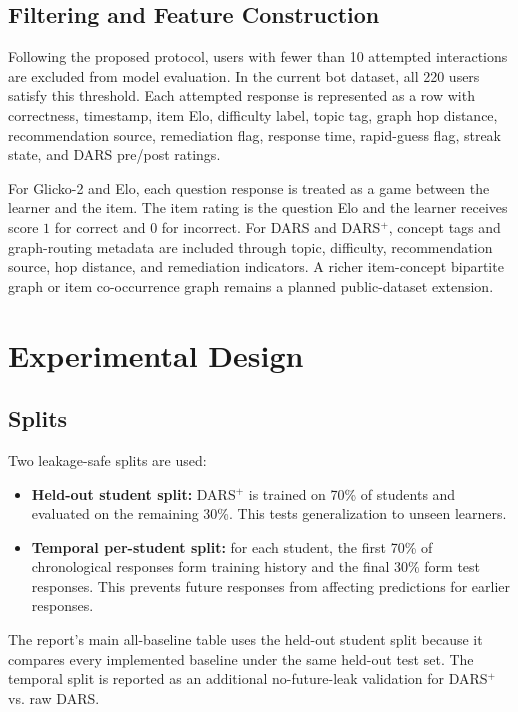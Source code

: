 \documentclass[sigconf,nonacm]{acmart}
\begin{document}
\subsection{Filtering and Feature Construction}
Following the proposed protocol, users with fewer than 10 attempted interactions are excluded from model evaluation. In the current bot dataset, all 220 users satisfy this threshold. Each attempted response is represented as a row with correctness, timestamp, item Elo, difficulty label, topic tag, graph hop distance, recommendation source, remediation flag, response time, rapid-guess flag, streak state, and DARS pre/post ratings.

For Glicko-2 and Elo, each question response is treated as a game between the learner and the item. The item rating is the question Elo and the learner receives score $1$ for correct and $0$ for incorrect. For DARS and DARS$^+$, concept tags and graph-routing metadata are included through topic, difficulty, recommendation source, hop distance, and remediation indicators. A richer item-concept bipartite graph or item co-occurrence graph remains a planned public-dataset extension.

\section{Experimental Design}
\subsection{Splits}
Two leakage-safe splits are used:

\begin{itemize}[leftmargin=*]
  \item \textbf{Held-out student split:} DARS$^+$ is trained on 70\% of students and evaluated on the remaining 30\%. This tests generalization to unseen learners.
  \item \textbf{Temporal per-student split:} for each student, the first 70\% of chronological responses form training history and the final 30\% form test responses. This prevents future responses from affecting predictions for earlier responses.
\end{itemize}

The report's main all-baseline table uses the held-out student split because it compares every implemented baseline under the same held-out test set. The temporal split is reported as an additional no-future-leak validation for DARS$^+$ vs. raw DARS.
\end{document}
